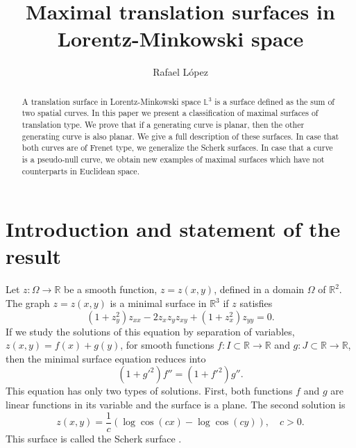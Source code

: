 \documentclass[a4paper,12pt]{amsart}
\numberwithin{equation}{section}
\theoremstyle{definition}
\def\r{\mathbb R}
\def\r{\mathbb R}
\def\rr{\mathbb L}
\begin{document}
\title{Maximal translation surfaces in Lorentz-Minkowski space }
\author{Rafael L\'opez}
\address{ Departament of Geometry and Topology\\ University of Granada. 18071 Granada, Spain}


\begin{abstract} A translation surface in Lorentz-Minkowski space $\rr^3$ is a surface defined as the sum of two spatial curves. In this paper we present a classification of maximal surfaces of translation type.  We prove that if a generating curve is planar, then    the other generating curve is also planar.  We give a full description of these surfaces. In case that both curves are of Frenet type, we generalize the Scherk surfaces. In case that a curve is a pseudo-null curve, we obtain new examples of maximal surfaces which have not counterparts in Euclidean space.
\end{abstract}

\maketitle

  

\section{Introduction  and statement of the result}
 
  Let $z\colon\Omega\to\r$ be a smooth function, $z=z(x,y)$, defined in a domain $\Omega$ of $\r^2$. The graph $z=z(x,y)$     is a minimal surface in $\r^3$ if  $z$ satisfies 
 $$(1+z_y^2)z_{xx}-2z_xz_yz_{xy}+(1+z_x^2)z_{yy}=0.$$
If we study the solutions of this equation by separation of variables, $z(x,y)=f(x)+g(y)$, for smooth functions $f\colon I\subset\r\to\r$ and $g\colon J\subset\r\to\r$, then the minimal surface equation reduces into
$$(1+g'^2)f''=(1+f'^2)g''.$$
This equation has only two types of solutions. First, both functions $f$ and $g$ are linear functions in its variable and  the surface is a plane. The second solution is 
\begin{equation}\label{sc}
z(x,y)=\frac{1}{c}\left(\log \cos(cx)-\log \cos(cy)\right),\quad c>0.
\end{equation}
This surface is called the Scherk surface \cite{sc}.  
\end{document}
